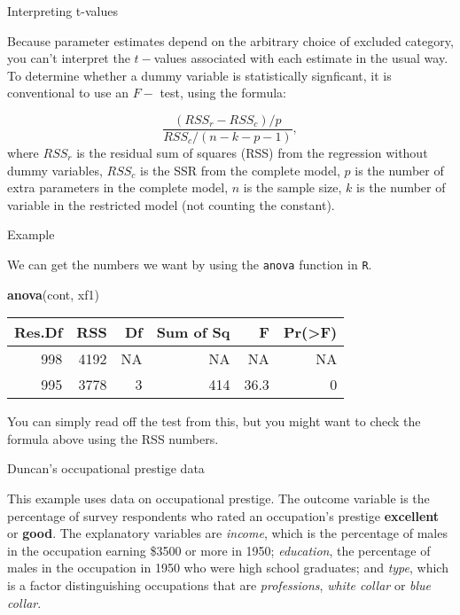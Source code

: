 \documentclass[10pt,ignorenonframetext,]{beamer}
\newenvironment{Shaded}{\begin{snugshade}}{\end{snugshade}}
\newcommand{\KeywordTok}[1]{\textcolor[rgb]{0.13,0.29,0.53}{\textbf{{#1}}}}
\newcommand{\NormalTok}[1]{{#1}}
\begin{document}
\begin{frame}{Interpreting t-values}

Because parameter estimates depend on the arbitrary choice of excluded
category, you can't interpret the \(t-\)values associated with each
estimate in the usual way. To determine whether a dummy variable is
statistically signficant, it is conventional to use an \(F-\) test,
using the formula:

\[
\frac{(RSS_r - RSS_c)/p}{RSS_c/(n-k-p-1)},
\] where \(RSS_r\) is the residual sum of squares (RSS) from the
regression without dummy variables, \(RSS_c\) is the SSR from the
complete model, \(p\) is the number of extra parameters in the complete
model, \(n\) is the sample size, \(k\) is the number of variable in the
restricted model (not counting the constant).

\end{frame}

\begin{frame}[fragile]{Example}

We can get the numbers we want by using the \texttt{anova} function in
\texttt{R}.

\begin{Shaded}
\begin{Highlighting}[]
\KeywordTok{anova}\NormalTok{(cont, xf1)}
\end{Highlighting}
\end{Shaded}

\begin{longtable}[]{@{}rrrrrr@{}}
\toprule
Res.Df & RSS & Df & Sum of Sq & F & Pr(\textgreater{}F)\tabularnewline
\midrule
\endhead
998 & 4192 & NA & NA & NA & NA\tabularnewline
995 & 3778 & 3 & 414 & 36.3 & 0\tabularnewline
\bottomrule
\end{longtable}

You can simply read off the test from this, but you might want to check
the formula above using the RSS numbers.

\end{frame}

\begin{frame}{Duncan's occupational prestige data}

This example uses data on occupational prestige. The outcome variable is
the percentage of survey respondents who rated an occupation's prestige
\textbf{excellent} or \textbf{good}. The explanatory variables are
\emph{income}, which is the percentage of males in the occupation
earning \$3500 or more in 1950; \emph{education}, the percentage of
males in the occupation in 1950 who were high school graduates; and
\emph{type}, which is a factor distinguishing occupations that are
\emph{professions}, \emph{white collar} or \emph{blue collar}.

\end{frame}
\end{document}
